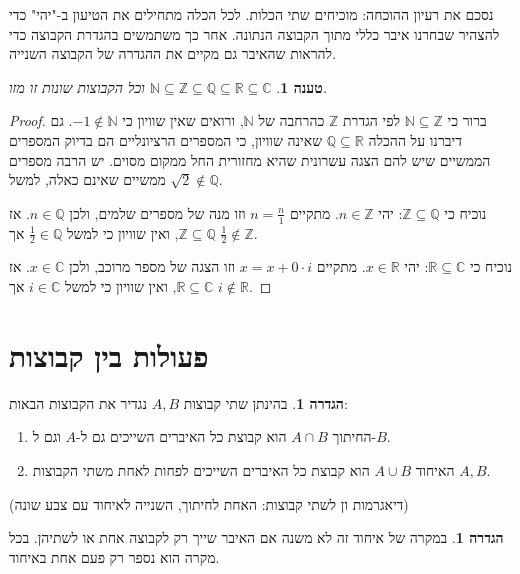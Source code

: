 \documentclass[12pt]{book}
\theoremstyle{plain}
\newtheorem{proposition}[theorem]{טענה}
\theoremstyle{definition}
\newtheorem{definition}[theorem]{הגדרה}
\newcommand{\R}{\mathbb R}
\newcommand{\N}{\mathbb N}
\newcommand{\Z}{\mathbb Z}
\newcommand{\Q}{\mathbb Q}
\newcommand{\C}{\mathbb C}
\begin{document}
נסכם את רעיון ההוכחה: מוכיחים שתי הכלות. לכל הכלה מתחילים את הטיעון
ב-"יהי" כדי להצהיר שבחרנו איבר כללי מתוך
הקבוצה הנתונה. אחר כך משתמשים בהגדרת הקבוצה כדי להראות שהאיבר גם מקיים
את ההגדרה של הקבוצה השנייה.

\begin{proposition} 
$\N\subseteq\Z\subseteq\Q\subseteq\R\subseteq\C$
וכל הקבוצות שונות זו מזו.
\end{proposition}

\begin{proof}
ברור כי $\N\subseteq\Z$ לפי הגדרת
$\Z$ כהרחבה של $\N$, ורואים שאין שוויון
כי $-1\notin\N$. גם דיברנו על ההכלה $\Q\subseteq\R$
שאינה שוויון, כי המספרים הרציונליים הם בדיוק המספרים הממשיים שיש להם
הצגה עשרונית שהיא מחזורית החל ממקום מסוים. יש הרבה מספרים ממשיים שאינם
כאלה, למשל $\sqrt{2}\notin\Q$.

נוכיח כי $\Z\subseteq\Q$: יהי $n\in\Z$.
מתקיים $n=\frac{n}{1}$ וזו מנה של מספרים שלמים, ולכן $n\in\Q$.
אז $\Z\subseteq\Q$, ואין שוויון כי למשל $\frac{1}{2}\in\Q$
אך $\frac{1}{2}\notin\Z$.

נוכיח כי $\R\subseteq\C$: יהי
$x\in\R$. מתקיים $x=x+0\cdot i$ וזו הצגה
של מספר מרוכב, ולכן $x\in\C$. אז $\R\subseteq\C$,
ואין שוויון כי למשל $i\in\C$ אך $i\notin\R$.
\end{proof}

\section{פעולות בין קבוצות}

\begin{definition}
בהינתן שתי קבוצות $A,B$ נגדיר את הקבוצות הבאות:

\begin{enumerate}
\item החיתוך $A\cap B$ הוא קבוצת כל האיברים השייכים גם ל-$A$
וגם ל-$B$.

\item האיחוד $A\cup B$ הוא קבוצת כל האיברים השייכים לפחות לאחת משתי
הקבוצות $A,B$.
\end{enumerate}
\end{definition}

\begin{center}
(דיאגרמות ון לשתי קבוצות: האחת לחיתוך, השנייה לאיחוד עם צבע שונה)
\end{center}

\begin{definition}
במקרה של איחוד זה לא משנה אם האיבר שייך רק לקבוצה אחת
או לשתיהן. בכל מקרה הוא נספר רק פעם אחת באיחוד.
\end{definition}
\end{document}
